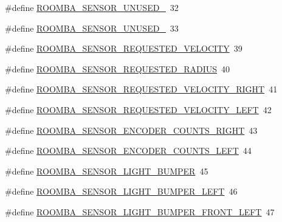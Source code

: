 \begin{DoxyCompactItemize}
\item 
\#define \hyperlink{group__roomba__sensor__extern_ga7e1760bf821a8181020bc860561b6e72}{R\-O\-O\-M\-B\-A\-\_\-\-S\-E\-N\-S\-O\-R\-\_\-\-U\-N\-U\-S\-E\-D\-\_}~32
\item 
\#define \hyperlink{group__roomba__sensor__extern_ga3e5888caf144aa3f4d2ee2b6e15f3687}{R\-O\-O\-M\-B\-A\-\_\-\-S\-E\-N\-S\-O\-R\-\_\-\-U\-N\-U\-S\-E\-D\-\_}~33
\item 
\#define \hyperlink{group__roomba__sensor__extern_gaa6cf173183ac4ff400f7d12b399b09a4}{R\-O\-O\-M\-B\-A\-\_\-\-S\-E\-N\-S\-O\-R\-\_\-\-R\-E\-Q\-U\-E\-S\-T\-E\-D\-\_\-\-V\-E\-L\-O\-C\-I\-T\-Y}~39
\item 
\#define \hyperlink{group__roomba__sensor__extern_ga6c83dc8d27d9f2a22dc3435d9310ca00}{R\-O\-O\-M\-B\-A\-\_\-\-S\-E\-N\-S\-O\-R\-\_\-\-R\-E\-Q\-U\-E\-S\-T\-E\-D\-\_\-\-R\-A\-D\-I\-U\-S}~40
\item 
\#define \hyperlink{group__roomba__sensor__extern_ga99232d32e088b8719ab9752748e8b49f}{R\-O\-O\-M\-B\-A\-\_\-\-S\-E\-N\-S\-O\-R\-\_\-\-R\-E\-Q\-U\-E\-S\-T\-E\-D\-\_\-\-V\-E\-L\-O\-C\-I\-T\-Y\-\_\-\-R\-I\-G\-H\-T}~41
\item 
\#define \hyperlink{group__roomba__sensor__extern_gafa7dd7ed1d3e67c8551e2be540c56956}{R\-O\-O\-M\-B\-A\-\_\-\-S\-E\-N\-S\-O\-R\-\_\-\-R\-E\-Q\-U\-E\-S\-T\-E\-D\-\_\-\-V\-E\-L\-O\-C\-I\-T\-Y\-\_\-\-L\-E\-F\-T}~42
\item 
\#define \hyperlink{group__roomba__sensor__extern_gaec90dd94f95bc7cc663ca52c9a3e8371}{R\-O\-O\-M\-B\-A\-\_\-\-S\-E\-N\-S\-O\-R\-\_\-\-E\-N\-C\-O\-D\-E\-R\-\_\-\-C\-O\-U\-N\-T\-S\-\_\-\-R\-I\-G\-H\-T}~43
\item 
\#define \hyperlink{group__roomba__sensor__extern_ga215bbf96794fd028ac7e389ec8b7c369}{R\-O\-O\-M\-B\-A\-\_\-\-S\-E\-N\-S\-O\-R\-\_\-\-E\-N\-C\-O\-D\-E\-R\-\_\-\-C\-O\-U\-N\-T\-S\-\_\-\-L\-E\-F\-T}~44
\item 
\#define \hyperlink{group__roomba__sensor__extern_ga403c15eb2bbf6d5fda5f648427c0ac88}{R\-O\-O\-M\-B\-A\-\_\-\-S\-E\-N\-S\-O\-R\-\_\-\-L\-I\-G\-H\-T\-\_\-\-B\-U\-M\-P\-E\-R}~45
\item 
\#define \hyperlink{group__roomba__sensor__extern_ga7d36f21a211ec98cfc7dde8051b2988e}{R\-O\-O\-M\-B\-A\-\_\-\-S\-E\-N\-S\-O\-R\-\_\-\-L\-I\-G\-H\-T\-\_\-\-B\-U\-M\-P\-E\-R\-\_\-\-L\-E\-F\-T}~46
\item 
\#define \hyperlink{group__roomba__sensor__extern_ga5e692dc0f496a559fe87ae71dd774cff}{R\-O\-O\-M\-B\-A\-\_\-\-S\-E\-N\-S\-O\-R\-\_\-\-L\-I\-G\-H\-T\-\_\-\-B\-U\-M\-P\-E\-R\-\_\-\-F\-R\-O\-N\-T\-\_\-\-L\-E\-F\-T}~47

\end{DoxyCompactItemize}
